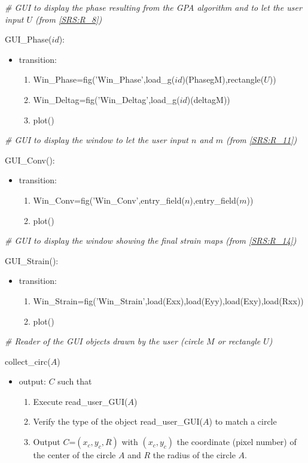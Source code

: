 \documentclass[12pt, titlepage]{article}
\begin{document}
\noindent\textit{{\#} GUI to display the phase resulting from the GPA algorithm 
and to let the user input $U$ (from \cref{SRS:R_8})}\medskip

\noindent GUI{\_}Phase($id$):
\begin{itemize}
\item transition: 
	\begin{enumerate}
	\item Win{\_}Phase=fig('Win{\_}Phase',load{\_}g($id$)(PhasegM),rectangle($U$))
	\item Win{\_}Deltag=fig('Win{\_}Deltag',load{\_}g($id$)(deltagM))
	\item plot()
	\end{enumerate} 
\end{itemize}
\bigskip

\noindent\textit{{\#} GUI to display the window to let the user input $n$ and 
$m$ (from \cref{SRS:R_11})}\medskip

\noindent GUI{\_}Conv():
\begin{itemize}
\item transition: 
	\begin{enumerate}
	\item Win{\_}Conv=fig('Win{\_}Conv',entry{\_}field($n$),entry{\_}field($m$))
	\item plot()
	\end{enumerate} 
\end{itemize}
\bigskip

\noindent\textit{{\#} GUI to display the window showing the final strain maps 
(from \cref{SRS:R_14})}\medskip

\noindent GUI{\_}Strain():
\begin{itemize}
\item transition: 
	\begin{enumerate}
	\item 
Win{\_}Strain=fig('Win{\_}Strain',load(Exx),load(Eyy),load(Exy),load(Rxx))
	\item plot()
	\end{enumerate} 
\end{itemize}
\bigskip


\noindent\textit{{\#} Reader of the GUI objects drawn by the user (circle $M$ or 
rectangle $U$)} \medskip

\noindent collect{\_}circ($A$)
\begin{itemize}
\item output: $C$ such that
	\begin{enumerate}
	\item Execute read{\_}user{\_}GUI($A$)
	\item Verify the type of the object read{\_}user{\_}GUI($A$) to match a circle
	\item Output $C$=$(x_c,y_c,R)$ with $(x_c,y_c)$ the coordinate (pixel number) 
of the center of the circle $A$ and $R$ the radius of the circle $A$.
	\end{enumerate} 
\end{itemize}
\bigskip
\end{document}

